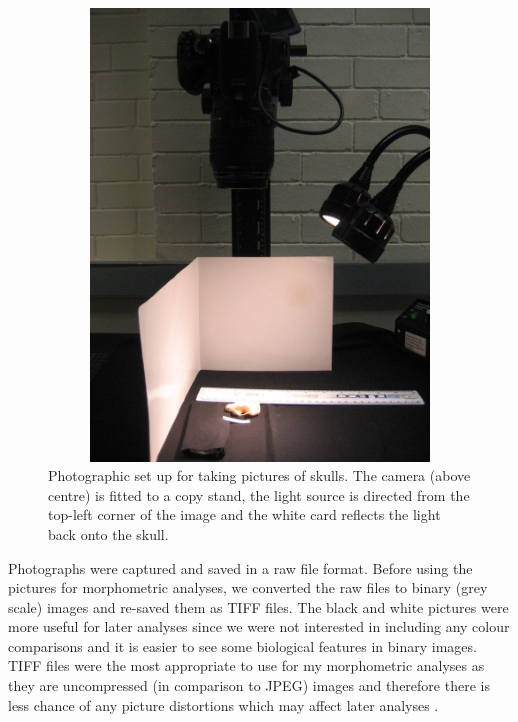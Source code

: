 \documentclass[12pt,a4paper]{article}
\begin{document}
\begin{figure}[H] 
  \centering
  \includegraphics[width=12cm, height=12cm, keepaspectratio=true]{figures/camera.jpg}
    \caption[Photographic set up]%
    {Photographic set up for taking pictures of skulls. The camera (above centre) is fitted to a copy stand, the light source is directed from the top-left corner of the image and the white card reflects the light back onto the skull. }%
  \label{fig:camera}
  \end{figure}

Photographs were captured and saved in a raw file format. Before using the pictures for morphometric analyses, we converted the raw files to binary (grey scale) images and re-saved them as TIFF files. The black and white pictures were more useful for later analyses since we were not interested in including any colour comparisons and it is easier to see some biological features in binary images. TIFF files were the most appropriate to use for my morphometric analyses as they are uncompressed (in comparison to JPEG) images and therefore there is less chance of any picture distortions which may affect later analyses \citep{HERC2013}.
\end{document}
